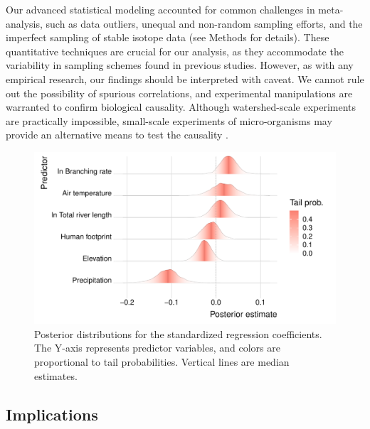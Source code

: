 \documentclass[11pt, class=article, crop=false]{standalone}
\begin{document}
Our advanced statistical modeling accounted for common challenges in meta-analysis, such as data outliers, unequal and non-random sampling efforts, and the imperfect sampling of stable isotope data (see Methods for details).
These quantitative techniques are crucial for our analysis, as they accommodate the variability in sampling schemes found in previous studies.
However, as with any empirical research, our findings should be interpreted with caveat.
We cannot rule out the possibility of spurious correlations, and experimental manipulations are warranted to confirm biological causality.
Although watershed-scale experiments are practically impossible, small-scale experiments of micro-organisms may provide an alternative means to test the causality \citep{altermatt_big_2015, green_long_2023}.

\begin{figure}
    \centering
    \includegraphics[width=0.75\linewidth]{output/fig_emp_ridge.pdf}
    \caption{Posterior distributions for the standardized regression coefficients. The Y-axis represents predictor variables, and colors are proportional to tail probabilities. Vertical lines are median estimates.}
    \label{fig:ridge}
\end{figure}

\subsection{Implications}
\end{document}
